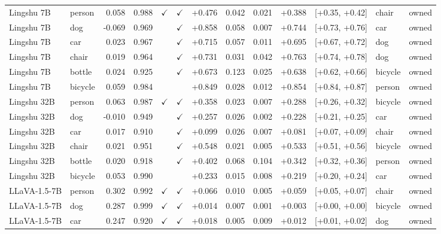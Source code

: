 \begin{longtable}{llrrccrrrrrll}
\rowcolor{cfSlate2}Lingshu 7B & person & 0.058 & 0.988 & $\checkmark$ & $\checkmark$ & +0.476 & 0.042 & 0.021 & +0.388 & [+0.35, +0.42] & chair & owned \\
\rowcolor{cfSlate2}Lingshu 7B & dog & -0.069 & 0.969 &  & $\checkmark$ & +0.858 & 0.058 & 0.007 & +0.744 & [+0.73, +0.76] & car & owned \\
\rowcolor{cfSlate2}Lingshu 7B & car & 0.023 & 0.967 &  & $\checkmark$ & +0.715 & 0.057 & 0.011 & +0.695 & [+0.67, +0.72] & dog & owned \\
\rowcolor{cfSlate2}Lingshu 7B & chair & 0.019 & 0.964 &  & $\checkmark$ & +0.731 & 0.031 & 0.042 & +0.763 & [+0.74, +0.78] & dog & owned \\
\rowcolor{cfSlate2}Lingshu 7B & bottle & 0.024 & 0.925 &  & $\checkmark$ & +0.673 & 0.123 & 0.025 & +0.638 & [+0.62, +0.66] & bicycle & owned \\
\rowcolor{cfSlate2}Lingshu 7B & bicycle & 0.059 & 0.984 &  &  & +0.849 & 0.028 & 0.012 & +0.854 & [+0.84, +0.87] & person & owned \\
\rowcolor{cfSlate2}Lingshu 32B & person & 0.063 & 0.987 & $\checkmark$ & $\checkmark$ & +0.358 & 0.023 & 0.007 & +0.288 & [+0.26, +0.32] & bicycle & owned \\
\rowcolor{cfSlate2}Lingshu 32B & dog & -0.010 & 0.949 &  & $\checkmark$ & +0.257 & 0.026 & 0.002 & +0.228 & [+0.21, +0.25] & car & owned \\
\rowcolor{cfSlate2}Lingshu 32B & car & 0.017 & 0.910 &  & $\checkmark$ & +0.099 & 0.026 & 0.007 & +0.081 & [+0.07, +0.09] & chair & owned \\
\rowcolor{cfSlate2}Lingshu 32B & chair & 0.021 & 0.951 &  & $\checkmark$ & +0.548 & 0.021 & 0.005 & +0.533 & [+0.51, +0.56] & bicycle & owned \\
\rowcolor{cfSlate2}Lingshu 32B & bottle & 0.020 & 0.918 &  & $\checkmark$ & +0.402 & 0.068 & 0.104 & +0.342 & [+0.32, +0.36] & person & owned \\
\rowcolor{cfSlate2}Lingshu 32B & bicycle & 0.053 & 0.990 &  &  & +0.233 & 0.015 & 0.008 & +0.219 & [+0.20, +0.24] & car & owned \\
\rowcolor{cfSlate2}LLaVA-1.5-7B & person & 0.302 & 0.992 & $\checkmark$ & $\checkmark$ & +0.066 & 0.010 & 0.005 & +0.059 & [+0.05, +0.07] & chair & owned \\
\rowcolor{cfSlate2}LLaVA-1.5-7B & dog & 0.287 & 0.999 & $\checkmark$ & $\checkmark$ & +0.014 & 0.007 & 0.001 & +0.003 & [+0.00, +0.00] & bicycle & owned \\
\rowcolor{cfSlate2}LLaVA-1.5-7B & car & 0.247 & 0.920 & $\checkmark$ & $\checkmark$ & +0.018 & 0.005 & 0.009 & +0.012 & [+0.01, +0.02] & dog & owned \\

\end{longtable}

